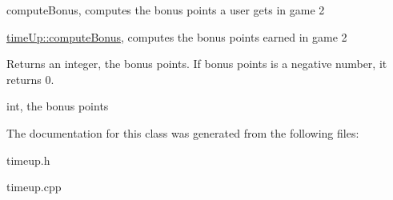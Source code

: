 compute\+Bonus, computes the bonus points a user gets in game 2 

\hyperlink{classtimeUp_ae248b5d925d67ef28cb795147d260a93}{time\+Up\+::compute\+Bonus}, computes the bonus points earned in game 2

\begin{DoxyReturn}{Returns}
an integer, the bonus points. If bonus points is a negative number, it returns 0.

int, the bonus points 
\end{DoxyReturn}


The documentation for this class was generated from the following files\+:\begin{DoxyCompactItemize}
\item 
timeup.\+h\item 
timeup.\+cpp\end{DoxyCompactItemize}
